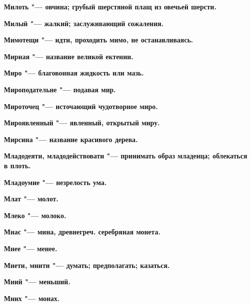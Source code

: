 \begin{mymulticols}{2}
\bfseries Милоть\normalfont{} "--- овчина; грубый шерстяной плащ из овечьей шерсти. 




\bfseries Милый\normalfont{} "--- жалкий; заслуживающий сожаления. 




\bfseries Мимотещи\normalfont{} "--- идти, проходить мимо, не останавливаясь. 




\bfseries Мирная\normalfont{} "--- название великой ектении. 




\bfseries Миро\normalfont{} "--- благовонная жидкость или мазь. 




\bfseries Мироподательне\normalfont{} "--- подавая мир. 




\bfseries Мироточец\normalfont{} "--- источающий чудотворное миро. 




\bfseries Мироявленный\normalfont{} "--- явленный, открытый миру. 




\bfseries Мирсина\normalfont{} "--- название красивого дерева. 




\bfseries Младодеяти, младодействовати\normalfont{} "--- принимать образ младенца; облекаться в плоть. 




\bfseries Младоумие\normalfont{} "--- незрелость ума. 




\bfseries Млат\normalfont{} "--- молот. 




\bfseries Млеко\normalfont{} "--- молоко. 




\bfseries Мнас\normalfont{} "--- мина, древнегреч. серебряная монета. 




\bfseries Мнее\normalfont{} "--- менее. 




\bfseries Мнети, мнити\normalfont{} "--- думать; предполагать; казаться. 




\bfseries Мний\normalfont{} "--- меньший. 




\bfseries Мних\normalfont{} "--- монах. 





\end{mymulticols}
